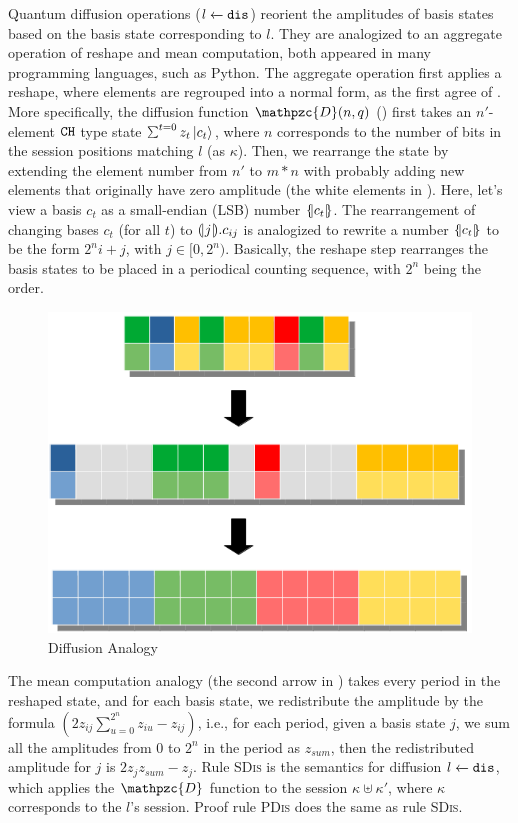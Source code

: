 \label{sec:diffuse}
Quantum diffusion operations (${l} \xleftarrow{} {\texttt{dis}}$) reorient the amplitudes of basis states based on the basis state corresponding to $l$. They are analogized to an aggregate operation of reshape and mean computation, both appeared in many programming languages, such as Python.
The aggregate operation first applies a reshape, where elements are regrouped into a normal form, as the first agree of . More specifically, the diffusion function $\mathpzc{D}(n,q)$ () first takes an $n'$-element $\texttt{CH}$ type state $\schi{t=0}{z_t}{c_t}$, where $n$ corresponds to the number of bits in the session positions matching $l$ (as $\kappa$).
Then, we rearrange the state by extending the element number from $n'$ to $m*n$ with probably adding new elements that originally have zero amplitude (the white elements in ).
Here, let's view a basis $c_{t}$ as a small-endian (LSB) number $\{\hspace{-0.2em}| c_{t} |\hspace{-0.2em}\}$. The rearrangement of changing bases $c_{t}$ (for all $t$) to $(\!| j |\!).c_{ij}$ is analogized to rewrite a number $\{\hspace{-0.2em}| c_{t} |\hspace{-0.2em}\}$ to be the form $2^n i+j$, with $j\in [0,2^n)$. 
Basically, the reshape step rearranges the basis states to be placed in a periodical counting sequence, with $2^n$ being the order.
%
\begin{figure}
  \includegraphics[width=.36\textwidth]{diffuse}
  \caption{Diffusion Analogy}
\label{fig:qafny-dis-analog}
\end{figure}
%
The mean computation analogy (the second arrow in ) takes every period in the reshaped state, and for each basis state, we redistribute the amplitude by the formula $(2 z_{ij}\sum_{u=0}^{2^n}z_{iu} - z_{ij})$, i.e., for each period, given a basis state $j$, we sum all the amplitudes from $0$ to $2^n$ in the period as $z_{sum}$, then the redistributed amplitude for $j$ is $2 z_j z_{sum}-z_j$. 
Rule \textsc{SDis} is the semantics for diffusion ${l} \xleftarrow{} {\texttt{dis}}$, which applies the $\mathpzc{D}$ function to the session $\kappa \uplus \kappa'$, where $\kappa$ corresponds to the $l$'s session. Proof rule \textsc{PDis} does the same as rule \textsc{SDis}.
